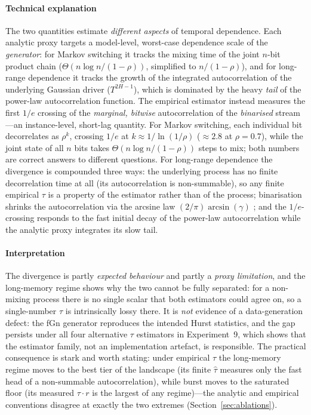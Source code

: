 \documentclass[sensors,article,submit,pdftex,moreauthors]{Definitions/mdpi}
\begin{document}
\paragraph{Technical explanation} The two quantities estimate \emph{different aspects} of temporal dependence. Each analytic proxy targets a model-level, worst-case dependence scale of the \emph{generator}: for Markov switching it tracks the mixing time of the joint $n$-bit product chain ($\Theta(n \log n/(1-\rho))$, simplified to $n/(1-\rho)$), and for long-range dependence it tracks the growth of the integrated autocorrelation of the underlying Gaussian driver ($T^{2H-1}$), which is dominated by the heavy \emph{tail} of the power-law autocorrelation function. The empirical estimator instead measures the first $1/e$ crossing of the \emph{marginal, bitwise} autocorrelation of the \emph{binarised} stream---an instance-level, short-lag quantity. For Markov switching, each individual bit decorrelates as $\rho^{k}$, crossing $1/e$ at $k \approx 1/\ln(1/\rho)$ ($\approx 2.8$ at $\rho = 0.7$), while the joint state of all $n$ bits takes $\Theta(n \log n/(1-\rho))$ steps to mix; both numbers are correct answers to different questions. For long-range dependence the divergence is compounded three ways: the underlying process has no finite decorrelation time at all (its autocorrelation is non-summable), so any finite empirical $\tau$ is a property of the estimator rather than of the process; binarisation shrinks the autocorrelation via the arcsine law $(2/\pi)\arcsin(\gamma)$ \citep{vanvleck1966spectrum}; and the $1/e$-crossing responds to the fast initial decay of the power-law autocorrelation while the analytic proxy integrates its slow tail.

\paragraph{Interpretation} The divergence is partly \emph{expected behaviour} and partly a \emph{proxy limitation}, and the long-memory regime shows why the two cannot be fully separated: for a non-mixing process there is no single scalar that both estimators could agree on, so a single-number $\tau$ is intrinsically lossy there. It is \emph{not} evidence of a data-generation defect: the fGn generator reproduces the intended Hurst statistics, and the gap persists under all four alternative $\tau$ estimators in Experiment~9, which shows that the estimator family, not an implementation artefact, is responsible. The practical consequence is stark and worth stating: under empirical $\tau$ the long-memory regime moves to the best tier of the landscape (its finite $\hat{\tau}$ measures only the fast head of a non-summable autocorrelation), while burst moves to the saturated floor (its measured $\tau \cdot r$ is the largest of any regime)---the analytic and empirical conventions disagree at exactly the two extremes (Section~\ref{sec:ablations}).
\end{document}
